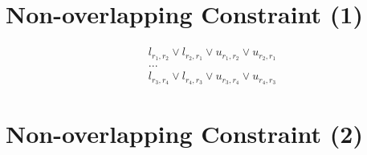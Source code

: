 \documentclass[a4paper,11pt]{book}
\begin{document}
\section{Non-overlapping Constraint (1)}

\begin{equation}
	\begin{aligned}
		& l_{r_1,r_2} \lor l_{r_2,r_1} \lor u_{r_1,r_2} \lor u_{r_2,r_1} \\
		&...\\
		& l_{r_3,r_4} \lor l_{r_4,r_3} \lor u_{r_3,r_4} \lor u_{r_4,r_3}
	\end{aligned}
\end{equation}

\section{Non-overlapping Constraint (2)}
\end{document}
